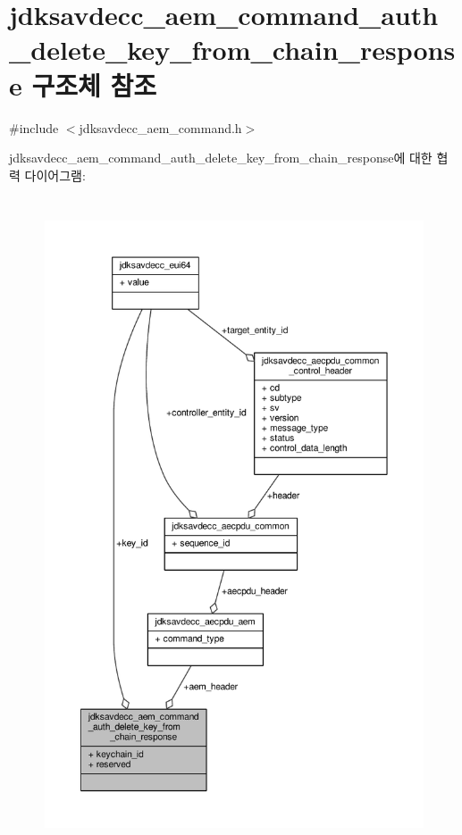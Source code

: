 \hypertarget{structjdksavdecc__aem__command__auth__delete__key__from__chain__response}{}\section{jdksavdecc\+\_\+aem\+\_\+command\+\_\+auth\+\_\+delete\+\_\+key\+\_\+from\+\_\+chain\+\_\+response 구조체 참조}
\label{structjdksavdecc__aem__command__auth__delete__key__from__chain__response}


{\ttfamily \#include $<$jdksavdecc\+\_\+aem\+\_\+command.\+h$>$}



jdksavdecc\+\_\+aem\+\_\+command\+\_\+auth\+\_\+delete\+\_\+key\+\_\+from\+\_\+chain\+\_\+response에 대한 협력 다이어그램\+:
\nopagebreak
\begin{figure}[H]
\begin{center}
\leavevmode
\includegraphics[height=550pt]{structjdksavdecc__aem__command__auth__delete__key__from__chain__response__coll__graph}
\end{center}
\end{figure}
